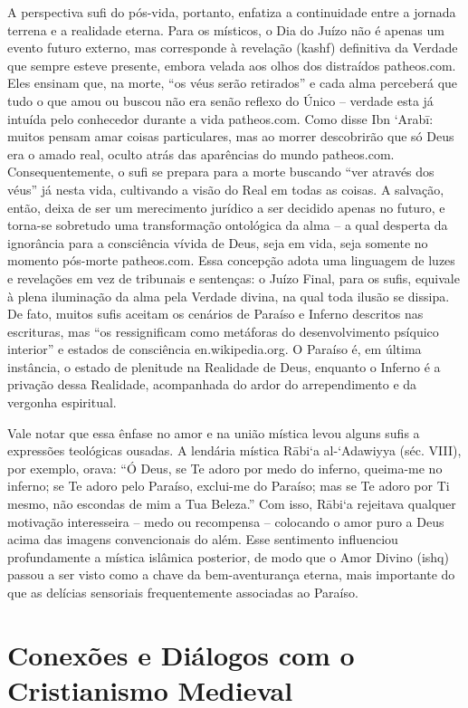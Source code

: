 A perspectiva sufi do pós-vida, portanto, enfatiza a continuidade entre a jornada terrena e a realidade eterna. Para os místicos, o Dia do Juízo não é apenas um evento futuro externo, mas corresponde à revelação (kashf) definitiva da Verdade que sempre esteve presente, embora velada aos olhos dos distraídos patheos.com. Eles ensinam que, na morte, “os véus serão retirados” e cada alma perceberá que tudo o que amou ou buscou não era senão reflexo do Único -- verdade esta já intuída pelo conhecedor durante a vida patheos.com. Como disse Ibn ‘Arabī: muitos pensam amar coisas particulares, mas ao morrer descobrirão que só Deus era o amado real, oculto atrás das aparências do mundo patheos.com. Consequentemente, o sufi se prepara para a morte buscando “ver através dos véus” já nesta vida, cultivando a visão do Real em todas as coisas. A salvação, então, deixa de ser um merecimento jurídico a ser decidido apenas no futuro, e torna-se sobretudo uma transformação ontológica da alma -- a qual desperta da ignorância para a consciência vívida de Deus, seja em vida, seja somente no momento pós-morte patheos.com. Essa concepção adota uma linguagem de luzes e revelações em vez de tribunais e sentenças: o Juízo Final, para os sufis, equivale à plena iluminação da alma pela Verdade divina, na qual toda ilusão se dissipa. De fato, muitos sufis aceitam os cenários de Paraíso e Inferno descritos nas escrituras, mas “os ressignificam como metáforas do desenvolvimento psíquico interior” e estados de consciência en.wikipedia.org. O Paraíso é, em última instância, o estado de plenitude na Realidade de Deus, enquanto o Inferno é a privação dessa Realidade, acompanhada do ardor do arrependimento e da vergonha espiritual.

Vale notar que essa ênfase no amor e na união mística levou alguns sufis a expressões teológicas ousadas. A lendária mística Rābi‘a al-‘Adawiyya (séc. VIII), por exemplo, orava: “Ó Deus, se Te adoro por medo do inferno, queima-me no inferno; se Te adoro pelo Paraíso, exclui-me do Paraíso; mas se Te adoro por Ti mesmo, não escondas de mim a Tua Beleza.” Com isso, Rābi‘a rejeitava qualquer motivação interesseira -- medo ou recompensa -- colocando o amor puro a Deus acima das imagens convencionais do além. Esse sentimento influenciou profundamente a mística islâmica posterior, de modo que o Amor Divino (ishq) passou a ser visto como a chave da bem-aventurança eterna, mais importante do que as delícias sensoriais frequentemente associadas ao Paraíso.

\section{Conexões e Diálogos com o Cristianismo Medieval}


